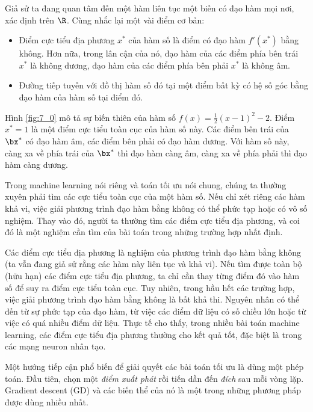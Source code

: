  
Giả sử ta đang quan tâm đến một hàm liên tục một biến có đạo hàm mọi nơi, xác
định trên $\R$. Cùng nhắc lại một vài điểm cơ bản:
\begin{itemize}
    \item Điểm cực tiểu địa phương $x^*$ của hàm số là điểm có đạo hàm $f'(x^*)$
    bằng không. Hơn nữa, trong lân cận của nó, đạo hàm của các điểm phía bên
    trái $x^*$ là không dương, đạo hàm của các điểm phía bên phải $x^*$ là không
    âm.

    \item Đường tiếp tuyến với đồ thị hàm số đó tại một điểm bất kỳ có hệ số góc
    bằng đạo hàm của hàm số tại điểm đó.
\end{itemize}
 
Hình \ref{fig:7_0} mô tả sự biến thiên của hàm số $f(x) = \frac{1}{2}(x - 1)^2 -
2$. Điểm $x^* = 1$ là một điểm cực tiểu toàn cục của hàm số này. Các điểm bên
trái của $\bx^*$ có đạo hàm âm, các điểm bên phải có đạo hàm dương. Với
hàm số này, càng xa về phía trái của $\bx^*$ thì đạo hàm càng âm, càng xa về
phía phải thì đạo hàm càng dương.
 
 
Trong machine learning nói riêng và toán tối ưu nói chung, chúng ta thường xuyên
phải tìm các cực tiểu toàn cục của một hàm số. Nếu chỉ xét riêng các hàm khả vi,
việc giải phương trình đạo hàm bằng không có thể phức tạp hoặc có vô số nghiệm.
Thay vào đó, người ta thường tìm các điểm cực tiểu địa phương, và coi đó là một
nghiệm cần tìm của bài toán trong những trường hợp nhất định.

Các điểm cực tiểu địa phương là nghiệm của phương trình đạo hàm bằng không (ta
vẫn đang giả sử rằng các hàm này liên tục và khả vi). Nếu tìm được toàn bộ (hữu
hạn) các điểm cực tiểu địa phương, ta chỉ cần thay từng điểm đó vào hàm số để
suy ra điểm cực tiểu toàn cục. Tuy nhiên, trong hầu hết các trường hợp, việc
giải phương trình đạo hàm bằng không là bất khả thi. Nguyên nhân có thể đến từ
sự phức tạp của đạo hàm, từ việc các điểm dữ liệu có số chiều lớn hoặc từ việc
có quá nhiều điểm dữ liệu. Thực tế cho thấy, trong nhiều bài toán machine
learning, các điểm cực tiểu địa phương thường cho kết quả tốt, đặc biệt là
trong các mạng neuron nhân tạo.

Một hướng tiếp cận phổ biến để giải quyết các bài toán tối ưu là dùng một phép
toán. Đầu tiên, chọn một \textit{điểm xuất phát} rồi tiến dần đến \textit{đích}
sau mỗi vòng lặp. Gradient descent (GD) và các biến thể của nó là một trong
những phương pháp được dùng nhiều nhất.

